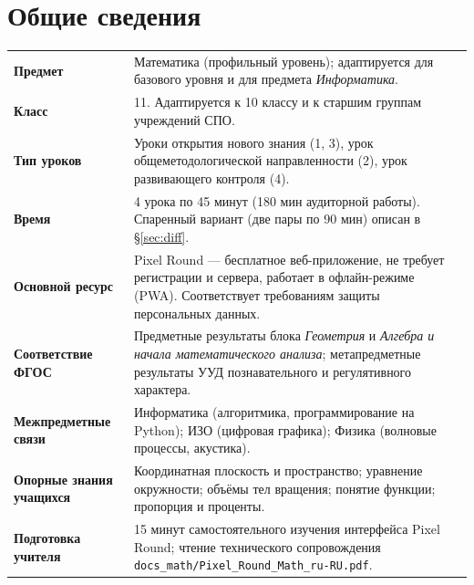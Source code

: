 \documentclass[12pt,a4paper]{scrartcl}
\begin{document}
\renewcommand{\contentsname}{\color{accent}Содержание}
\tableofcontents
\thispagestyle{fancy}
\newpage

\section{Общие сведения}

\begin{center}
\begin{tabular}{@{}p{}p{}@{}}
\toprule
\textbf{Предмет} & Математика (профильный уровень); адаптируется для базового уровня и для предмета \emph{Информатика}. \\
\addlinespace[2pt]
\textbf{Класс} & 11. Адаптируется к 10 классу и к старшим группам учреждений СПО. \\
\addlinespace[2pt]
\textbf{Тип уроков} & Уроки открытия нового знания (1, 3), урок общеметодологической направленности (2), урок развивающего контроля (4). \\
\addlinespace[2pt]
\textbf{Время} & 4 урока по 45 минут (180 мин аудиторной работы). Спаренный вариант (две пары по 90 мин) описан в §\ref{sec:diff}. \\
\addlinespace[2pt]
\textbf{Основной ресурс} & Pixel Round --- бесплатное веб-приложение, не требует регистрации и сервера, работает в офлайн-режиме (PWA). Соответствует требованиям защиты персональных данных. \\
\addlinespace[2pt]
\textbf{Соответствие ФГОС} & Предметные результаты блока \emph{Геометрия} и \emph{Алгебра и начала математического анализа}; метапредметные результаты УУД познавательного и регулятивного характера. \\
\addlinespace[2pt]
\textbf{Межпредметные связи} & Информатика (алгоритмика, программирование на Python); ИЗО (цифровая графика); Физика (волновые процессы, акустика). \\
\addlinespace[2pt]
\textbf{Опорные знания учащихся} & Координатная плоскость и пространство; уравнение окружности; объёмы тел вращения; понятие функции; пропорция и проценты. \\
\addlinespace[2pt]
\textbf{Подготовка учителя} & 15 минут самостоятельного изучения интерфейса Pixel Round; чтение технического сопровождения \texttt{docs\_math/Pixel\_Round\_Math\_ru-RU.pdf}. \\
\bottomrule
\end{tabular}
\end{center}
\end{document}

